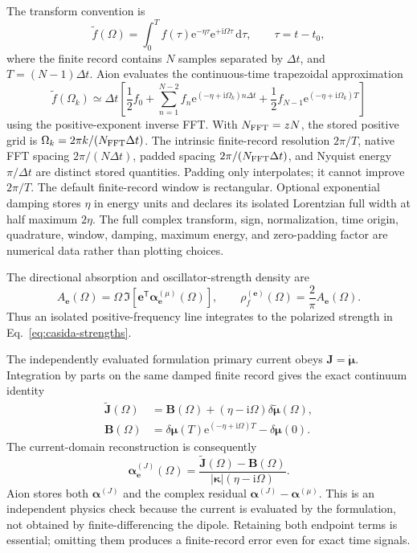 \documentclass[11pt]{article}
\newcommand{\ii}{\mathrm{i}}
\newcommand{\dd}{\mathrm{d}}
\newcommand{\ee}{\mathrm{e}}
\newcommand{\vect}[1]{\bm{#1}}
\begin{document}
The transform convention is
\begin{equation}
 \widetilde f(\Omega)
 =\int_0^T f(\tau)\ee^{-\eta\tau}
          \ee^{+\ii\Omega\tau}\,\dd\tau,
 \qquad \tau=t-t_0,
 \label{eq:fft-convention}
\end{equation}
where the finite record contains \(N\) samples separated by \(\Delta t\), and
\(T=(N-1)\Delta t\). Aion evaluates the continuous-time trapezoidal
approximation
\begin{equation}
 \widetilde f(\Omega_k)\simeq\Delta t\left[
 \frac12 f_0+\sum_{n=1}^{N-2}f_n
 \ee^{(-\eta+\ii\Omega_k)n\Delta t}
 +\frac12 f_{N-1}\ee^{(-\eta+\ii\Omega_k)T}\right]
 \label{eq:discrete-transform}
\end{equation}
using the positive-exponent inverse FFT. With \(N_{\rm FFT}=zN\), the stored
positive grid is \(\Omega_k=2\pi k/(N_{\rm FFT}\Delta t)\). The intrinsic
finite-record resolution \(2\pi/T\), native FFT spacing
\(2\pi/(N\Delta t)\), padded spacing
\(2\pi/(N_{\rm FFT}\Delta t)\), and Nyquist energy \(\pi/\Delta t\) are
distinct stored quantities. Padding only interpolates; it cannot improve
\(2\pi/T\). The default finite-record window is rectangular. Optional
exponential damping stores \(\eta\) in energy units and declares its isolated
Lorentzian full width at half maximum \(2\eta\). The full complex transform,
sign, normalization, time origin, quadrature, window, damping, maximum energy,
and zero-padding factor are numerical data rather than plotting choices.

The directional absorption and oscillator-strength density are
\begin{equation}
 A_{\vect e}(\Omega)=\Omega\,\Im\left[
 \vect e^{\mathsf T}\vect\alpha_{\vect e}^{(\mu)}(\Omega)\right],
 \qquad
 \rho_f^{(\vect e)}(\Omega)=\frac{2}{\pi}A_{\vect e}(\Omega).
 \label{eq:kick-strength}
\end{equation}
Thus an isolated positive-frequency line integrates to the polarized strength
in Eq.~\eqref{eq:casida-strengths}.

The independently evaluated formulation primary current obeys
\(\vect J=\dot{\vect\mu}\). Integration by parts on the same damped finite
record gives the exact continuum identity
\begin{align}
 \widetilde{\vect J}(\Omega)
 &=\vect B(\Omega)+(\eta-\ii\Omega)
   \delta\widetilde{\vect\mu}(\Omega),\\
 \vect B(\Omega)
 &=\delta\vect\mu(T)\ee^{(-\eta+\ii\Omega)T}
   -\delta\vect\mu(0).
 \label{eq:current-transform-identity}
\end{align}
The current-domain reconstruction is consequently
\begin{equation}
 \vect\alpha_{\vect e}^{(J)}(\Omega)=
 \frac{\widetilde{\vect J}(\Omega)-\vect B(\Omega)}
      {\lvert\vect\kappa\rvert(\eta-\ii\Omega)}.
 \label{eq:current-alpha}
\end{equation}
Aion stores both \(\vect\alpha^{(J)}\) and the complex residual
\(\vect\alpha^{(J)}-\vect\alpha^{(\mu)}\). This is an independent physics
check because the current is evaluated by the formulation, not obtained by
finite-differencing the dipole. Retaining both endpoint terms is essential;
omitting them produces a finite-record error even for exact time signals.
\end{document}
